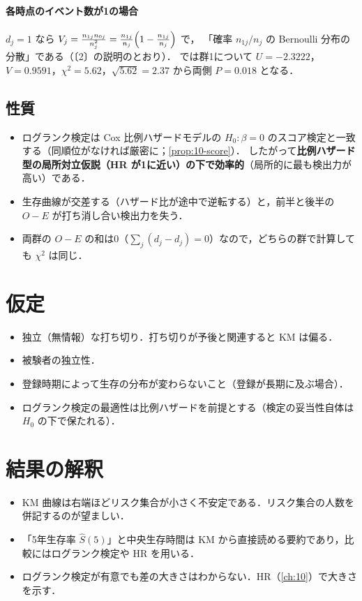 \paragraph{各時点のイベント数が1の場合}
$d_j=1$ なら $V_j=\frac{n_{1j}n_{0j}}{n_j^2}=\frac{n_{1j}}{n_j}\Bigl(1-\frac{n_{1j}}{n_j}\Bigr)$ で，
「確率 $n_{1j}/n_j$ の Bernoulli 分布の分散」である（〔2〕の説明のとおり）．
 では群1について $U=-2.3222$，$V=0.9591$，$\chi^2=5.62$，$\sqrt{5.62}=2.37$ から両側 $P=0.018$ となる．

\subsection{性質}
\begin{itemize}
\item ログランク検定は Cox 比例ハザードモデルの $H_0:\beta=0$ のスコア検定と一致する（同順位がなければ厳密に；\cref{prop:10-score}）．
      したがって\textbf{比例ハザード型の局所対立仮説（HR が1に近い）の下で効率的}（局所的に最も検出力が高い）である．
\item 生存曲線が交差する（ハザード比が途中で逆転する）と，前半と後半の $O-E$ が打ち消し合い検出力を失う．
\item 両群の $O-E$ の和は0（$\sum_j(d_j-d_j)=0$）なので，どちらの群で計算しても $\chi^2$ は同じ．
\end{itemize}

\section{仮定}\label{sec:09-assump}
\begin{itemize}
\item 独立（無情報）な打ち切り．打ち切りが予後と関連すると KM は偏る．
\item 被験者の独立性．
\item 登録時期によって生存の分布が変わらないこと（登録が長期に及ぶ場合）．
\item ログランク検定の最適性は比例ハザードを前提とする（検定の妥当性自体は $H_0$ の下で保たれる）．
\end{itemize}

\section{結果の解釈}\label{sec:09-interp}
\begin{itemize}
\item KM 曲線は右端ほどリスク集合が小さく不安定である．リスク集合の人数を併記するのが望ましい．
\item 「5年生存率 $\hat S(5)$」と中央生存時間は KM から直接読める要約であり，比較にはログランク検定や HR を用いる．
\item ログランク検定が有意でも差の大きさはわからない．HR（\cref{ch:10}）で大きさを示す．
\end{itemize}

